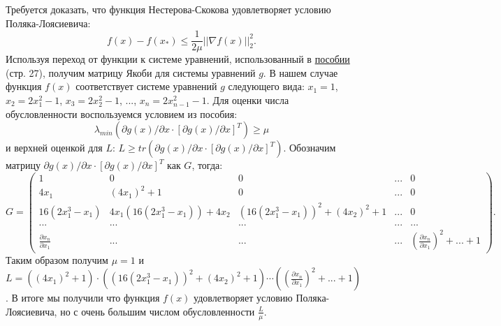 \documentclass[12pt]{report}
\begin{document}
Требуется доказать, что функция Нестерова-Скокова удовлетворяет условию Поляка-Лоясиевича:
\begin{equation}\label{condition}
f(x)-f(x_{*})\leq\frac{1}{2\mu}||\nabla f(x)||_{2}^{2}.
\end{equation}
Используя переход от функции к системе уравнений, использованный в \href{https://arxiv.org/pdf/1711.00394.pdf}{пособии} (стр. 27), получим матрицу Якоби для системы уравнений $g$. В нашем случае функция $f(x)$ соответствует системе уравнений $g$ следующего вида: $x_{1}=1$, $x_{2}=2x_{1}^{2}-1$, $x_{3}=2x_{2}^{2}-1$, ..., $x_{n}=2x_{n-1}^{2}-1$. Для оценки числа обусловленности воспользуемся условием из пособия:
\begin{equation}\label{condition2}
\lambda_{min}(\partial g(x)/\partial x\cdot [\partial g(x)/\partial x]^{T})\geq\mu
\end{equation}
и верхней оценкой для $L$: $L\geq tr(\partial g(x)/\partial x\cdot [\partial g(x)/\partial x]^{T})$. Обозначим матрицу $\partial g(x)/\partial x\cdot [\partial g(x)/\partial x]^{T}$ как $G$, тогда:
\begin{equation}\label{matrix}
G= \begin{pmatrix}
	1 & 0 & 0 & ... & 0\\
	4x_{1} & (4x_{1})^{2} + 1 & 0 & ... & 0\\
	16(2x_{1}^{3}-x_{1}) & 4x_{1}(16(2x_{1}^{3}-x_{1})) + 4x_{2} & (16(2x_{1}^{3}-x_{1}))^{2} + (4x_{2})^{2} + 1 & ... & 0\\
	... & ... & ... & ... & ...\\
	\frac{\partial x_{n}}{\partial x_{1}} & ... & ... & ... & (\frac{\partial x_{n}}{\partial x_{1}})^{2} + ... + 1
   \end{pmatrix}.
\end{equation}
Таким образом получим $\mu=1$ и $L=((4x_{1})^{2} + 1)\cdot((16(2x_{1}^{3}-x_{1}))^{2} + (4x_{2})^{2} + 1)\cdots((\frac{\partial x_{n}}{\partial x_{1}})^{2} + ... + 1)$. В итоге мы получили что функция $f(x)$ удовлетворяет условию Поляка-Лоясиевича, но с очень большим числом обусловленности $\frac{L}{\mu}$.
\end{document}
